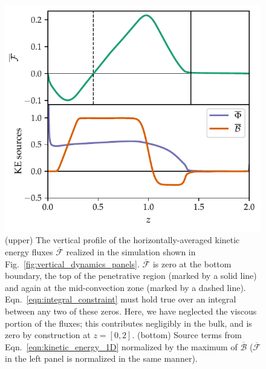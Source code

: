 \documentclass[twocolumn]{aastex631}
\renewcommand{\bar}[1]{\overline{#1}}
\begin{document}
\begin{figure}[t!]
\centering
\includegraphics[width=\columnwidth]{theory_profiles.pdf}
\caption{
(upper) The vertical profile of the horizontally-averaged kinetic energy fluxes $\bar{\mathcal{F}}$ realized in the simulation shown in Fig.~\ref{fig:vertical_dynamics_panels}. 
$\bar{\mathcal{F}}$ is zero at the bottom boundary, the top of the penetrative region (marked by a solid line) and again at the mid-convection zone (marked by a dashed line).
Eqn.~\ref{eqn:integral_constraint} must hold true over an integral between any two of these zeros.
Here, we have neglected the viscous portion of the fluxes; this contributes negligibly in the bulk, and is zero by construction at $z = [0, 2]$.
(bottom) Source terms from Eqn.~\ref{eqn:kinetic_energy_1D} normalized by the maximum of $\overline{\mathcal{B}}$ ($\bar{\mathcal{F}}$ in the left panel is normalized in the same manner).
\label{fig:theory_profiles}
}
\end{figure}
\end{document}
